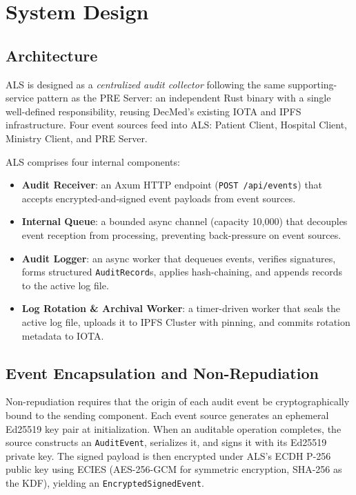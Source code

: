 \section{System Design}
\label{sec:design}

\subsection{Architecture}

ALS is designed as a \emph{centralized audit collector} following the same
supporting-service pattern as the PRE Server: an independent Rust binary with
a single well-defined responsibility, reusing DecMed's existing IOTA and IPFS
infrastructure. Four event sources feed into ALS: Patient Client, Hospital
Client, Ministry Client, and PRE Server.

ALS comprises four internal components:

\begin{itemize}
    \item \textbf{Audit Receiver}: an Axum HTTP endpoint
    (\texttt{POST /api/events}) that accepts encrypted-and-signed event
    payloads from event sources.

    \item \textbf{Internal Queue}: a bounded async channel (capacity 10{,}000)
    that decouples event reception from processing, preventing back-pressure
    on event sources.

    \item \textbf{Audit Logger}: an async worker that dequeues events,
    verifies signatures, forms structured \texttt{AuditRecord}s, applies
    hash-chaining, and appends records to the active log file.

    \item \textbf{Log Rotation \& Archival Worker}: a timer-driven worker that
    seals the active log file, uploads it to IPFS Cluster with pinning, and
    commits rotation metadata to IOTA.
\end{itemize}

\subsection{Event Encapsulation and Non-Repudiation}

Non-repudiation requires that the origin of each audit event be
cryptographically bound to the sending component. Each event source generates
an ephemeral Ed25519 key pair at initialization. When an auditable operation
completes, the source constructs an \texttt{AuditEvent}, serializes it, and
signs it with its Ed25519 private key. The signed payload is then encrypted
under ALS's ECDH P-256 public key using ECIES (AES-256-GCM for symmetric
encryption, SHA-256 as the KDF), yielding an \texttt{EncryptedSignedEvent}.

